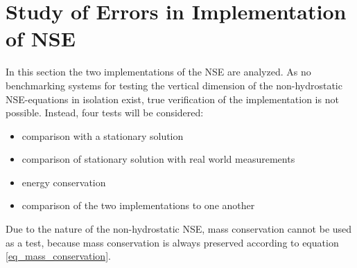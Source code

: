 

\section{Study of Errors in Implementation of NSE}
In this section the two implementations of the NSE are analyzed.
As no benchmarking systems for testing the vertical dimension of the non-hydrostatic NSE-equations in isolation exist, true verification of the implementation is not possible.
Instead, four tests will be considered:
\begin{itemize}
\item comparison with a stationary solution
\item comparison of stationary solution with real world measurements
\item energy conservation
\item comparison of the two implementations to one another
\end{itemize}
Due to the nature of the non-hydrostatic NSE, mass conservation cannot be used as a test, because mass conservation is always preserved according to equation \ref{eq_mass_conservation}.

